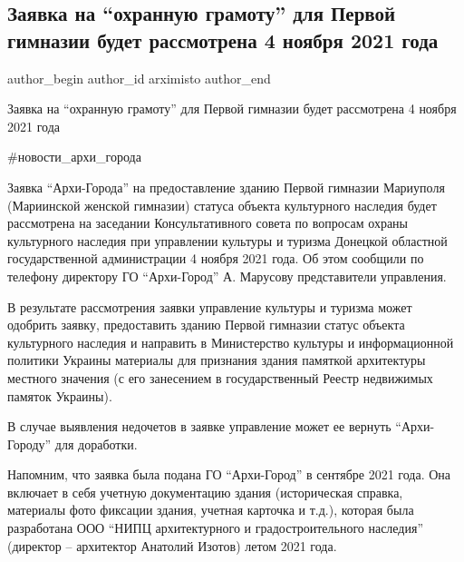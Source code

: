  
 
 
 
 

\subsection{Заявка на \enquote{охранную грамоту} для Первой гимназии будет рассмотрена 4 ноября 2021 года}
\label{sec:27_10_2021.fb.arximisto.1.zajavka_ohrannaja_gramota_pervaja_gimnazia}

\ifcmt
 author_begin
   author_id arximisto
 author_end
\fi

Заявка на \enquote{охранную грамоту} для Первой гимназии будет рассмотрена 4
ноября 2021 года

\#новости\_архи\_города

Заявка \enquote{Архи-Города} на предоставление зданию Первой гимназии Мариуполя
(Мариинской женской гимназии) статуса объекта культурного наследия будет
рассмотрена на заседании Консультативного совета по вопросам охраны культурного
наследия при управлении культуры и туризма Донецкой областной государственной
администрации 4 ноября 2021 года. Об этом сообщили по телефону директору ГО
\enquote{Архи-Город} А. Марусову представители управления. 

В результате рассмотрения заявки управление культуры и туризма может одобрить
заявку, предоставить зданию Первой гимназии статус объекта культурного наследия
и направить в Министерство культуры и информационной политики Украины материалы
для признания здания памяткой архитектуры местного значения (с его занесением в
государственный Реестр недвижимых памяток Украины). 

В случае выявления недочетов в заявке управление может ее вернуть
\enquote{Архи-Городу} для доработки.

Напомним, что заявка была подана ГО \enquote{Архи-Город} в сентябре 2021 года. Она
включает в себя учетную документацию здания (историческая справка, материалы
фото фиксации здания, учетная карточка и т.д.), которая была разработана ООО
\enquote{НИПЦ архитектурного и градостроительного наследия} (директор – архитектор
Анатолий Изотов) летом 2021 года. 

